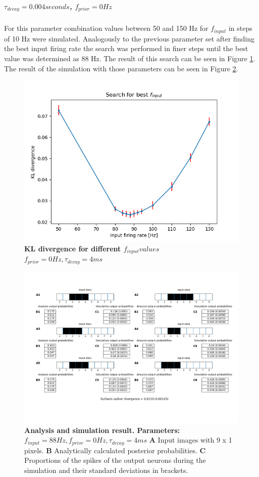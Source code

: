 \subparagraph{$\tau_{decay} = 0.004 seconds$, $f_{prior} = 0 Hz$}
For this parameter combination values between 50 and 150 Hz for $f_{input}$ in steps of 10 Hz were simulated. Analogously to the previous parameter set after finding the best input firing rate the search was performed in finer steps until the best value was determined as 88 Hz. The result of this search can be seen in Figure \ref{fig:1D_KLD_fPrior0_tau4}. The result of the simulation with those parameters can be seen in Figure \ref{fig:1D_88_0_4}.

\begin{figure}
  \includegraphics[width=\linewidth]{figures/1D/KLDvsfInput_fPrior0tau4.png}
  \caption{\textbf{KL divergence for different $f_{input} values$} $f_{prior} = 0 Hz, \tau_{decay} = 4 ms$}
  \label{fig:1D_KLD_fPrior0_tau4}
\end{figure}

\begin{figure}
  \includegraphics[width=\linewidth]{figures/1D/1D_88_0_4.png}
  \caption{\textbf{Analysis and simulation result. Parameters: } $f_{input} = 88 Hz, f_{prior} = 0 Hz, \tau_{decay} = 4 ms$ \textbf{A} Input images with 9 x 1 pixels. \textbf{B} Analytically calculated posterior probabilities. \textbf{C} Proportions of the spikes of the output neurons during the simulation and their standard deviations in brackets.}
  \label{fig:1D_88_0_4}
\end{figure}

